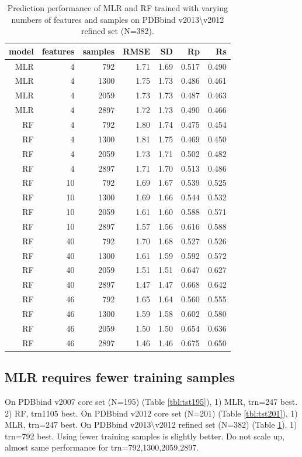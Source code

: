 \documentclass[journal=jacsat,manuscript=article]{achemso}
\begin{document}
\begin{table}
\caption{Prediction performance of MLR and RF trained with varying numbers of features and samples on PDBbind v2013\textbackslash v2012 refined set (N=382).}
\label{tbl:tst382}
\begin{tabular}{rrrrrrr}
\hline
model & features & samples & RMSE & SD & Rp & Rs\\
\hline
MLR &  4 &  792 & 1.71 & 1.69 & 0.517 & 0.490\\
MLR &  4 & 1300 & 1.75 & 1.73 & 0.486 & 0.461\\
MLR &  4 & 2059 & 1.73 & 1.73 & 0.487 & 0.463\\
MLR &  4 & 2897 & 1.72 & 1.73 & 0.490 & 0.466\\
 RF &  4 &  792 & 1.80 & 1.74 & 0.475 & 0.454\\
 RF &  4 & 1300 & 1.81 & 1.75 & 0.469 & 0.450\\
 RF &  4 & 2059 & 1.73 & 1.71 & 0.502 & 0.482\\
 RF &  4 & 2897 & 1.71 & 1.70 & 0.513 & 0.486\\
 RF & 10 &  792 & 1.69 & 1.67 & 0.539 & 0.525\\
 RF & 10 & 1300 & 1.69 & 1.66 & 0.544 & 0.532\\
 RF & 10 & 2059 & 1.61 & 1.60 & 0.588 & 0.571\\
 RF & 10 & 2897 & 1.57 & 1.56 & 0.616 & 0.588\\
 RF & 40 &  792 & 1.70 & 1.68 & 0.527 & 0.526\\
 RF & 40 & 1300 & 1.61 & 1.59 & 0.592 & 0.572\\
 RF & 40 & 2059 & 1.51 & 1.51 & 0.647 & 0.627\\
 RF & 40 & 2897 & 1.47 & 1.47 & 0.668 & 0.642\\
 RF & 46 &  792 & 1.65 & 1.64 & 0.560 & 0.555\\
 RF & 46 & 1300 & 1.59 & 1.58 & 0.602 & 0.580\\
 RF & 46 & 2059 & 1.50 & 1.50 & 0.654 & 0.636\\
 RF & 46 & 2897 & 1.46 & 1.46 & 0.675 & 0.650\\
\hline
\end{tabular}
\end{table}

\subsection{MLR requires fewer training samples}

On PDBbind v2007 core set (N=195) (Table \ref{tbl:tst195}), 1) MLR, trn=247 best. 2) RF, trn1105 best. 
On PDBbind v2012 core set (N=201) (Table \ref{tbl:tst201}), 1) MLR, trn=247 best.
On PDBbind v2013\textbackslash v2012 refined set (N=382) (Table \ref{tbl:tst382}), 1) trn=792 best. Using fewer training samples is slightly better. Do not scale up, almost same performance for trn=792,1300,2059,2897.
\end{document}
